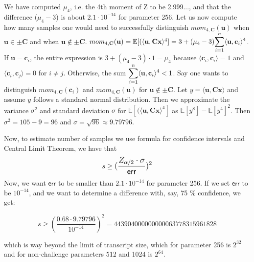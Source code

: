 \documentclass[12 pt]{article}        	%
\newcommand{\mat}[1]{\mathbf{#1}}
\renewcommand{\vec}[1]{\mathbf{#1}}
\newcommand{\bb}[1]{\mathbb{#1}}
\begin{document}
We have computed $\mu_4$, i.e. the 4th moment of Z to be 2.999..., and that the difference ($\mu_4 - 3$) is about $2.1 \cdot 10^{-14}$ for parameter 256.
Let us now compute how many samples one would need to successfully distinguish $mom_{4, \mat{C}}(\vec{u})$ when $\vec{u} \in \pm \mat{C}$ and when $\vec{u} \not\in\pm\mat{C}$.
$mom_{4, \mat{C}}(\vec{u}) = \bb{E}[(\langle \vec{u}, \mat{C}\vec{x} \rangle ^4] = 3 + (\mu_4 - 3) \mathlarger{\sum_{i=1}^{n} \langle \vec{u}, \vec{c}_i \rangle ^4}$.
If $\vec{u} = \vec{c}_i$, the entire expression is $3 + (\mu_4 - 3)\cdot 1 = \mu_4$ because $\langle \vec{c}_i, \vec{c}_i \rangle = 1$ and $\langle \vec{c}_i, \vec{c}_j \rangle = 0$ for $i \neq j$. 
Otherwise, the sum $\mathlarger{\sum_{i=1}^{n} \langle \vec{u}, \vec{c}_i \rangle ^4} < 1$.
Say one wants to distinguish $mom_{4, \mat{C}}(\vec{c}_i)$ and $mom_{4, \mat{C}}(\vec{u})$ for $\vec{u} \not\in\pm\mat{C}$.
Let $y = \langle \vec{u}, \mat{C} \vec{x} \rangle$ and assume $y$ follows a standard normal distribution.
Then we approximate the variance $\sigma^2$ and standard deviation $\sigma$ for $\bb{E}[(\langle \vec{u}, \mat{C}\vec{x} \rangle ^4]$ as $\bb{E}[y^8] - \bb{E}[y^4]^2$.
Then $\sigma^2 = 105 - 9 = 96$ and $\sigma = \sqrt{96} \approx 9.79796$.

Now, to estimate number of samples we use formula for confidence intervals and Central Limit Theorem, we have that 
\[
    s \geq \mathlarger{(\frac{Z_{\alpha/2} \cdot \sigma}{\mathsf{err}})^2}
\]
Now, we want $\mathsf{err}$ to be smaller than $2.1 \cdot 10^{-14}$ for parameter 256.
If we set $\mathsf{err}$ to be $10^{-14}$, and we want to determine a difference with, say, 75 \% confidence, we get:

\[
    s \geq (\frac{0.68 \cdot 9.79796}{10^{-14}})^2 = 443904000000000063778315961828 
\]

which is way beyond the limit of transcript size, which for parameter 256 is $2^{32}$ and for non-challenge parameters 512 and 1024 is $2^{64}$.
\end{document}
